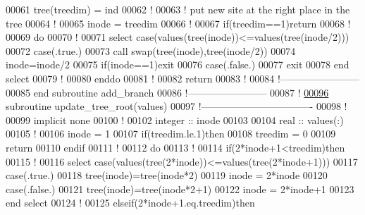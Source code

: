 \begin{DoxyCode}
00061     tree(treedim) = ind
00062     \textcolor{comment}{!}
00063     \textcolor{comment}{! put new site at the right place in the tree}
00064     \textcolor{comment}{!}
00065     inode = treedim
00066     \textcolor{comment}{!}
00067     \textcolor{keyword}{if}(treedim==1)return
00068     \textcolor{comment}{!}
00069     \textcolor{keyword}{do} 
00070        \textcolor{comment}{!}
00071        \textcolor{keyword}{select} \textcolor{keyword}{case}(values(tree(inode))<=values(tree(inode/2)))
00072        \textcolor{keyword}{case}(.true.)
00073           call swap(tree(inode),tree(inode/2))
00074           inode=inode/2
00075           \textcolor{keyword}{if}(inode==1)exit
00076        \textcolor{keyword}{case}(.false.)
00077           exit
00078        \textcolor{keyword}{end select}
00079        \textcolor{comment}{!}
00080     \textcolor{keyword}{enddo}
00081     \textcolor{comment}{!}
00082     return
00083     \textcolor{comment}{!}
00084   \textcolor{comment}{!------------------------}
00085 \textcolor{keyword}{  end subroutine add\_branch}
00086   \textcolor{comment}{!------------------------}
00087   \textcolor{comment}{!}
\hypertarget{module__binary__tree_8f90_source_l00096}{}\hyperlink{classmodule__binary__tree_a337bb7bdb8a65779775bb85e5b8b0c76}{00096}   \textcolor{keyword}{subroutine }update\_tree\_root(values)
00097   \textcolor{comment}{!----------------------------------}
00098     \textcolor{comment}{!}
00099     \textcolor{keyword}{implicit none}
00100     \textcolor{comment}{!}
00102     \textcolor{keywordtype}{integer} :: inode
00103 
00104     \textcolor{keywordtype}{real} :: values(:)
00105     \textcolor{comment}{! }
00106     inode = 1
00107     \textcolor{keyword}{if}(treedim.le.1)\textcolor{keyword}{then}
00108        treedim = 0
00109        return
00110     \textcolor{keyword}{endif}
00111     \textcolor{comment}{!}
00112     \textcolor{keyword}{do}
00113        \textcolor{comment}{!}
00114        \textcolor{keyword}{if}(2*inode+1<treedim)\textcolor{keyword}{then}
00115           \textcolor{comment}{!}
00116           \textcolor{keyword}{select} \textcolor{keyword}{case}(values(tree(2*inode))<=values(tree(2*inode+1)))
00117           \textcolor{keyword}{case}(.true.)
00118              tree(inode)=tree(inode*2)
00119              inode = 2*inode
00120           \textcolor{keyword}{case}(.false.)
00121              tree(inode)=tree(inode*2+1)
00122              inode = 2*inode+1
00123           \textcolor{keyword}{end select}
00124           \textcolor{comment}{!}
00125        elseif(2*inode+1.eq.treedim)\textcolor{keyword}{then}

\end{DoxyCode}
